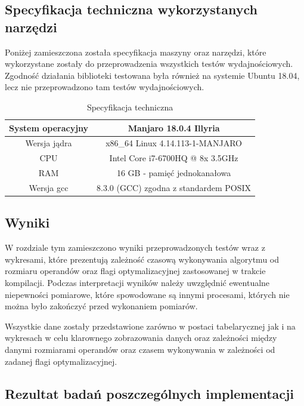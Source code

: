 \documentclass{article}
\begin{document}
\clearpage

\subsection{Specyfikacja techniczna wykorzystanych narzędzi}

Poniżej zamieszczona została specyfikacja maszyny oraz narzędzi, które wykorzystane zostały do przeprowadzenia wszystkich testów wydajnościowych. Zgodność działania biblioteki testowana była również na systemie Ubuntu 18.04, lecz nie przeprowadzono tam testów wydajnościowych.

\begin{table}[htbp]
\centering
\begin{tabular}{|c|c|}
\hline
System operacyjny & Manjaro 18.0.4 Illyria                \\ \hline
Wersja jądra      & x86\_64 Linux 4.14.113-1-MANJARO      \\ \hline
CPU               & Intel Core i7-6700HQ @ 8x 3.5GHz      \\ \hline
RAM               & 16 GB - pamięć jednokanałowa          \\ \hline
Wersja gcc        & 8.3.0 (GCC) zgodna z standardem POSIX \\ \hline
\end{tabular}
\caption{Specyfikacja techniczna}
\label{tab:Specyfikacja techniczna}
\end{table}

\subsection{Wyniki}

W rozdziale tym zamieszczono wyniki przeprowadzonych testów wraz z wykresami, które prezentują zależność czasową wykonywania algorytmu od rozmiaru operandów oraz flagi optymalizacyjnej zastosowanej w trakcie kompilacji. Podczas interpretacji wyników należy uwzględnić ewentualne niepewności pomiarowe, które spowodowane są innymi procesami, których nie można było zakończyć przed wykonaniem pomiarów.

Wszystkie dane zostały przedstawione zarówno w postaci tabelarycznej jak i na wykresach w celu klarownego zobrazowania danych oraz zależności między danymi rozmiarami operandów oraz czasem wykonywania w zależności od zadanej flagi optymalizacyjnej.

\newpage{}

\subsection{Rezultat badań poszczególnych implementacji}
\end{document}
